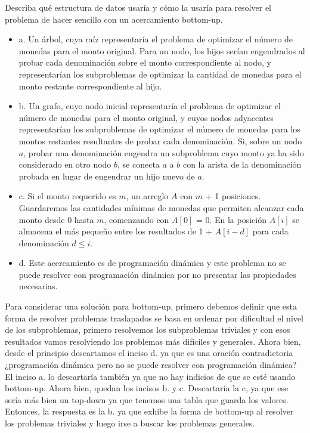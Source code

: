 \begin{problema}
    Describa qué estructura de datos usaría y cómo la usaría para resolver el problema de hacer sencillo con un acercamiento bottom-up.
    \begin{itemize}
        \item a. Un árbol, cuya raíz representaría el problema de optimizar el número de monedas para el monto original. Para un nodo, los hijos serían engendrados al probar cada denominación sobre el monto correspondiente al nodo, y representarían los subproblemas de optimizar la cantidad de monedas para el monto restante correspondiente al hijo.
        \item b. Un grafo, cuyo nodo inicial representaría el problema de optimizar el número de monedas para el monto original, y cuyos nodos adyacentes representarían los subproblemas de optimizar el número de monedas para los montos restantes resultantes de probar cada denominación. Si, sobre un nodo $a$, probar una denominación engendra un subproblema cuyo monto ya ha sido considerado en otro nodo $b$, se conecta $a$ a $b$ con la arista de la denominación probada en lugar de engendrar un hijo nuevo de $a$.
        \item c. Si el monto requerido es $m$, un arreglo $A$ con $m$ + 1 posiciones. Guardaremos las cantidades mínimas de monedas que permiten alcanzar cada monto desde 0 hasta $m$, comenzando con $A[0]$ = 0. En la posición $A[i]$ se almacena el más pequeño entre los resultados de 1 + $A[i - d]$ para cada denominación $d\leq i$.
        \item d. Este acercamiento es de programación dinámica y este problema no se puede resolver con programación dinámica por no presentar las propiedades necesarias.
    \end{itemize}
    \begin{sol}
        Para considerar una solución para bottom-up, primero debemos definir que esta forma de resolver problemas traslapados se basa en ordenar por dificultad el nivel de los subproblemas, primero resolvemos los subproblemas triviales y con esos resultados vamos resolviendo los problemas más difíciles y generales. Ahora bien, desde el principio descartamos el inciso d. ya que es una oración contradictoria ¿programación dinámica pero no se puede resolver con programación dinámica?  El inciso a. lo descartaría también ya que no hay indicios de que se esté usando bottom-up. Ahora bien, quedan los incisos b. y c. Descartaría la c, ya que ese sería más bien un top-down ya que tenemos una tabla que guarda los valores. Entonces, la respuesta es la b. ya que exhibe la forma de bottom-up al resolver los problemas triviales y luego irse a buscar los problemas generales. 
    \end{sol}
\end{problema}

